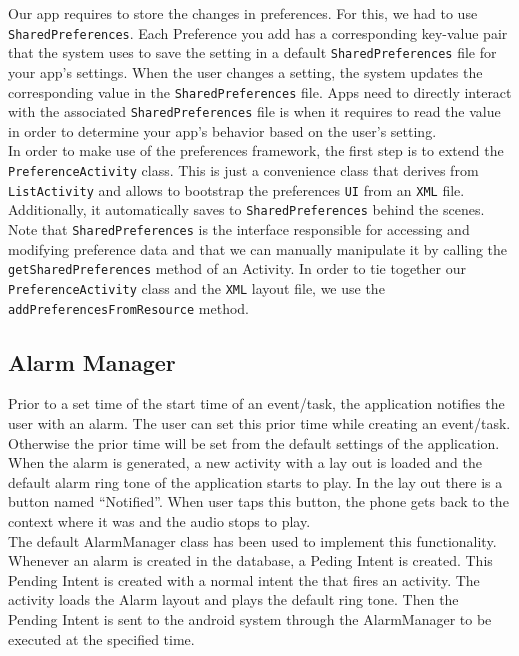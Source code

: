 \documentclass[10pt,a4paper]{report}
\begin{document}
Our app requires to store the changes in preferences. For this, we had to use \texttt{SharedPreferences}. Each Preference you add has a corresponding key-value pair that the system uses to save the setting in a default \texttt{SharedPreferences} file for your app's settings. When the user changes a setting, the system updates the corresponding value in the \texttt{SharedPreferences} file. Apps need to directly interact with the associated \texttt{SharedPreferences} file is when it requires to read the value in order to determine your app's behavior based on the user's setting. \\


In order to make use of the preferences framework, the first step is to extend the \texttt{PreferenceActivity} class. This is just a convenience class that derives from \texttt{ListActivity} and allows to bootstrap the preferences \texttt{UI} from an \texttt{XML} file. Additionally, it automatically saves to \texttt{SharedPreferences} behind the scenes. Note that \texttt{SharedPreferences} is the interface responsible for accessing and modifying preference data and that we can manually manipulate it by calling the \texttt{getSharedPreferences} method of an Activity. In order to tie together our \texttt{PreferenceActivity} class and the \texttt{XML} layout file, we use the \texttt{addPreferencesFromResource} method. 

\subsection{Alarm Manager}

Prior to a set time of the start time of an event/task, the application notifies the user with an alarm. The user can set this prior time while creating an event/task. Otherwise the prior time will be set from the default settings of the application. When the alarm is generated, a new activity with a lay out is loaded and the default alarm ring tone of the application starts to play. In the lay out there is a button named “Notified”. When user taps this button, the phone gets back to the context where it was and the audio stops to play. \\


The default AlarmManager class has been used to implement this functionality. Whenever an alarm is created in the database, a Peding Intent is created. This Pending Intent is created with a normal intent the that fires an activity. The activity loads the Alarm layout and plays the default ring tone. Then the Pending Intent is sent to the android system through the AlarmManager to be executed at the specified time. \\
\end{document}
